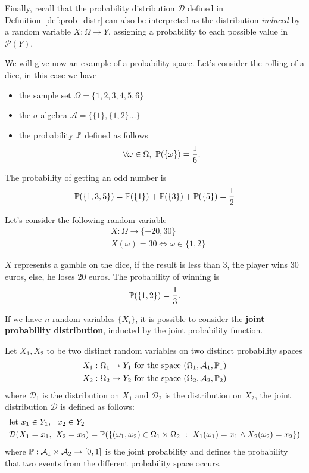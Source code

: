 \documentclass[10pt, letterpaper]{report}
\begin{document}
\bigskip
Finally, recall that the probability distribution $\mathcal D$ defined in Definition~\ref{def:prob_distr} can also be interpreted as the distribution \emph{induced} by a random variable $X:\Omega \to Y$, assigning a probability to each possible value in $\mathcal P(Y)$.

We will give now an example of a probability space. Let's consider the rolling of a dice, in this case we have\begin{itemize}
	\item the sample set $\Omega=\{1,2,3,4,5,6\}$
	\item the $\sigma$-algebra $\mathcal A = \{\{1\},\{1,2\}\dots\}$
	\item the probability ${\mathbb P}$ defined as follows\begin{equation}
		      \forall\omega\in \Omega, \ \Prob(\{\omega\})=\frac{1}{6}.
	      \end{equation}
\end{itemize}

The probability of getting an odd number is
\begin{equation}
	{\mathbb P}(\{1,3,5\})={\mathbb P}(\{1\})+{\mathbb P}(\{3\})+{\mathbb P}(\{5\})=\frac{1}{2}
\end{equation}

Let's consider the following random variable
\begin{align}
	 & X:\Omega\rightarrow\{-20,30\}    \\
	 & X(\omega)=30\iff\omega\in\{1,2\}
\end{align}

$X$ represents a gamble on the dice, if the result is less than 3, the player wins 30 euros, else, he loses 20 euros. The probability of winning is
\begin{equation}
	{\mathbb P}(\{1,2\})=\frac{1}{3}.
\end{equation}

If we have $n$ random variables $\{X_i\}$, it is possible to consider the \textbf{joint probability distribution}, inducted by the joint probability function.

Let $X_1,X_2$ to be two distinct random variables on two distinct probability spaces
\begin{align}
	 & X_1:\Omega_1\rightarrow Y_1 \text{ for the space }(\Omega_1,\mathcal A_1,{\mathbb P}_1) \\
	 & X_2:\Omega_2\rightarrow Y_2 \text{ for the space }(\Omega_2,\mathcal A_2,{\mathbb P}_2)
\end{align}
where $\mathcal D_1$ is the distribution on $X_1$ and $\mathcal D_2$ is the distribution on $X_2$, the joint distribution $\mathcal D$ is defined as follows:
\begin{align}
	 & \text{let }x_1\in Y_1, \ \ x_2\in Y_2                                                                                                 \\
	 & \mathcal D(X_1=x_1, \ X_2=x_2)=\Prob(\{(\omega_1,\omega_2)\in\Omega_1\times\Omega_2 \ : \ X_1(\omega_1)=x_1\land X_2(\omega_2)=x_2\})
\end{align}
where ${\mathbb P}:\mathcal A_1\times\mathcal A_2\rightarrow[0,1]$ is the joint probability and defines the probability that two events from the different probability space occurs.
\end{document}
